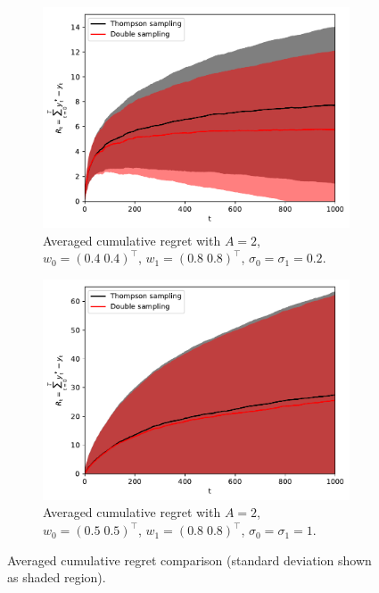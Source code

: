 \documentclass[10pt]{article}
\begin{document}
\begin{figure}[!h]
	\centering
	\begin{subfigure}[b]{0.5\textwidth}
		\includegraphics[width=\textwidth]{./figs/linearGaussian/cumulative_regret_great.pdf}
		\caption{Averaged cumulative regret with $A=2$, \\ $w_0=(0.4 \; 0.4)^\top$, $w_1=(0.8 \; 0.8)^\top$, $\sigma_0=\sigma_1=0.2$.}
		\label{fig:linearGaussian_cumulative_regret_great}
	\end{subfigure}%
	\begin{subfigure}[b]{0.5\textwidth}
		\includegraphics[width=\textwidth]{./figs/linearGaussian/cumulative_regret_notgreat.pdf}
		\caption{Averaged cumulative regret with $A=2$, \\ $w_0=(0.5 \; 0.5)^\top$, $w_1=(0.8 \; 0.8)^\top$, $\sigma_0=\sigma_1=1$.}
		\label{fig:linearGaussian_cumulative_regret_notgreat}
	\end{subfigure}
	\caption{Averaged cumulative regret comparison (standard deviation shown as shaded region).}
	\label{fig:linearGaussian_cumulative_regret_compare}
\end{figure}
\end{document}
